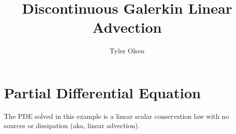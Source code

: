 \documentclass[11pt]{article}
\begin{document}
\title{Discontinuous Galerkin Linear Advection}
\author{Tyler Olsen}
\maketitle


\section{Partial Differential Equation}
The PDE solved in this example is a linear scalar conservation law 
with no sources or dissipation (aka, linear advection).
\end{document}
